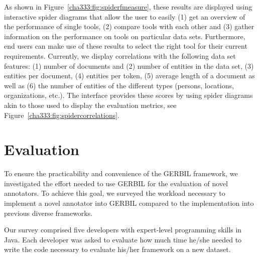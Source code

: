  As shown in Figure~\ref{cha333:fig:spiderfmeasure}, these results are displayed using interactive spider diagrams that allow the user to easily (1) get an overview of the performance of single tools, (2) compare tools with each other and (3) gather information on the performance on tools on particular data sets.
Furthermore, end users can make use of these results to select the right tool for their current requirements. Currently, we display correlations with the following data set features: (1) number of documents and (2) number of entities in the data set, (3) entities per document, (4) entities per token, (5) average length of a document as well as (6) the number  of entities of the different types (persons, locations, organizations, etc.). The interface provides these scores by using spider diagrams akin to those used to display the evaluation metrics, see Figure~\ref{cha333:fig:spidercorrelations}.





\section{Evaluation}
\label{cha332:sec:eval}

To ensure the practicability and convenience of the GERBIL framework, we investigated the effort needed to use GERBIL for the evaluation of novel annotators.
To achieve this goal, we surveyed the workload necessary to implement a novel annotator into GERBIL compared to the implementation into previous diverse frameworks.

Our survey comprised five developers with expert-level programming skills in Java. Each developer was asked to evaluate how much time he/she needed to write the code necessary to evaluate his/her framework on a new dataset.

